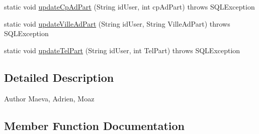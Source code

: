 \begin{DoxyCompactItemize}
\item 
static void \hyperlink{classcom_1_1ecetech_1_1bti4_1_1itproject_1_1classified_1_1dao_1_1_particulier_d_a_o_ada1b25c056da3b0e4b1fe9b9f32bbe47}{update\+Cp\+Ad\+Part} (String id\+User, int cp\+Ad\+Part)  throws S\+Q\+L\+Exception 
\item 
static void \hyperlink{classcom_1_1ecetech_1_1bti4_1_1itproject_1_1classified_1_1dao_1_1_particulier_d_a_o_aa902ab4baffe2f3d01ab2d652d084e57}{update\+Ville\+Ad\+Part} (String id\+User, String Ville\+Ad\+Part)  throws S\+Q\+L\+Exception 
\item 
static void \hyperlink{classcom_1_1ecetech_1_1bti4_1_1itproject_1_1classified_1_1dao_1_1_particulier_d_a_o_a1bf005b9911ce09d8daa26abf9fdf04e}{update\+Tel\+Part} (String id\+User, int Tel\+Part)  throws S\+Q\+L\+Exception 
\end{DoxyCompactItemize}


\subsection{Detailed Description}
\begin{DoxyAuthor}{Author}
Maeva, Adrien, Moaz 
\end{DoxyAuthor}


\subsection{Member Function Documentation}
